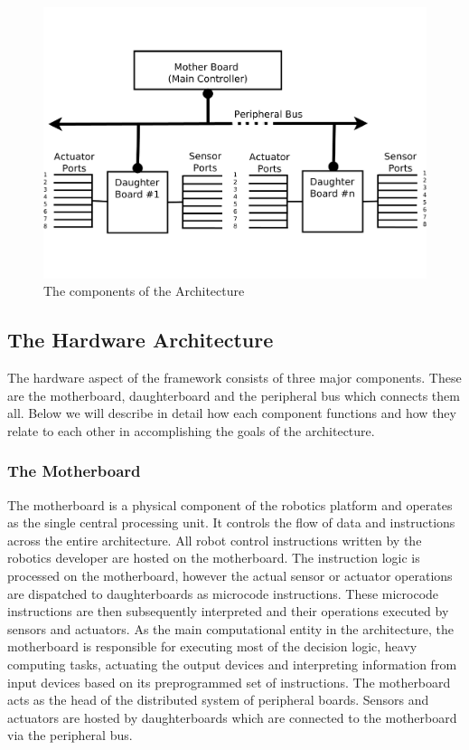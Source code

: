 \begin{figure}[h]
  \begin{center}
    \includegraphics[width=1.0\columnwidth]{Figures/system_block_diagram.pdf}
    \caption{The components of the \xten Architecture}
  \end{center}
\end{figure}

\subsection{The Hardware Architecture} %
\label{sub:the_hardware_architecture}
The hardware aspect of the \xten framework consists of three major components. These are the motherboard, daughterboard and the peripheral bus which connects them all. Below we will describe in detail how each component functions and how they relate to each other in accomplishing the goals of the architecture.



	\subsubsection{The Motherboard} %
	\label{ssub:the_motherboard}
	The motherboard is a physical component of the robotics platform and operates as the single central processing unit. It controls the flow of data and instructions across the entire \xten architecture. All robot control instructions written by the robotics developer are hosted on the motherboard. The instruction logic is processed on the motherboard, however the actual sensor or actuator operations are dispatched to daughterboards as microcode instructions. These microcode instructions are then subsequently interpreted and their operations executed by sensors and actuators. As the main computational entity in the \xten architecture, the motherboard is responsible for executing most of the decision logic, heavy computing tasks, actuating the output devices and interpreting information from input devices based on its preprogrammed set of instructions.
The motherboard acts as the head of the distributed system of peripheral boards. Sensors and actuators are hosted by daughterboards which are connected to the motherboard via the peripheral bus. 
 
